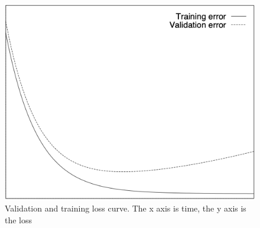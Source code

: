 \begin{figure}[htb]
    \centering
    \includegraphics[scale = 0.3]{img/over_fitting.png}
    \caption[Validation and training loss curve]{Validation and training loss curve. The x axis is time, the y axis is the loss \cite{early_stopping}}
    \label{fig:over_fitting_curve}
\end{figure}


